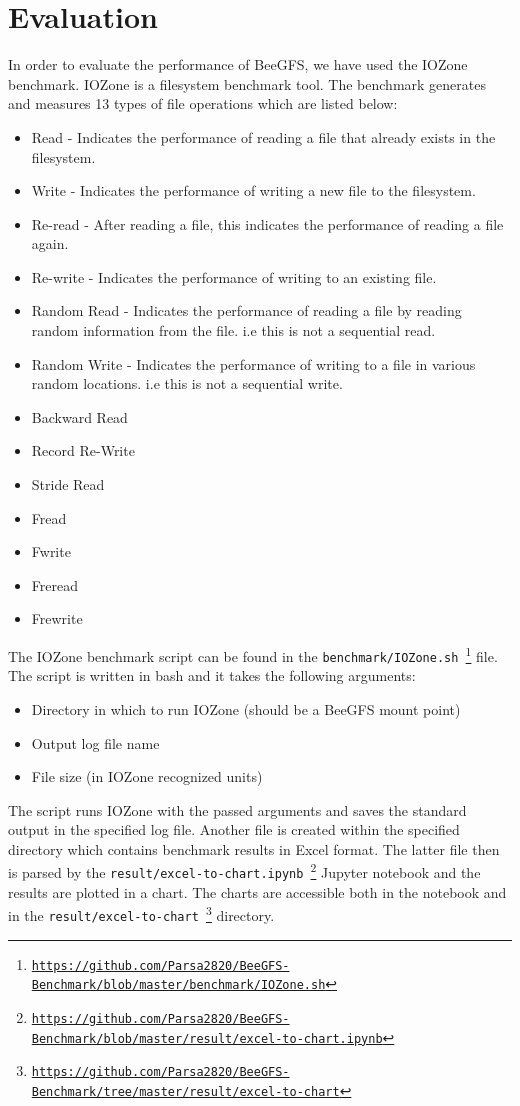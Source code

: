 \documentclass{article}
\begin{document}
\section{Evaluation}
In order to evaluate the performance of BeeGFS, we have used the IOZone benchmark.
IOZone is a filesystem benchmark tool. The benchmark generates and measures 13 types of file operations which are listed below: \cite{iozoneexample}
\begin{itemize}
    \item Read - Indicates the performance of reading a file that already exists in the filesystem.
    \item Write - Indicates the performance of writing a new file to the filesystem.
    \item Re-read - After reading a file, this indicates the performance of reading a file again.
    \item Re-write - Indicates the performance of writing to an existing file.
    \item Random Read - Indicates the performance of reading a file by reading random information from the file. i.e this is not a sequential read.
    \item Random Write - Indicates the performance of writing to a file in various random locations. i.e this is not a sequential write.
    \item Backward Read
    \item Record Re-Write
    \item Stride Read
    \item Fread
    \item Fwrite
    \item Freread
    \item Frewrite
\end{itemize}
The IOZone benchmark script can be found in the \texttt{benchmark/IOZone.sh \footnote{\url{https://github.com/Parsa2820/BeeGFS-Benchmark/blob/master/benchmark/IOZone.sh}}} file. The script is written in bash and it takes the following arguments:
\begin{itemize}
    \item Directory in which to run IOZone (should be a BeeGFS mount point)
    \item Output log file name
    \item File size (in IOZone recognized units)
\end{itemize}
The script runs IOZone with the passed arguments and saves the standard output in the specified log file. Another file is created within the specified directory which contains benchmark results in Excel format. The latter file then is parsed by the \texttt{result/excel-to-chart.ipynb \footnote{\url{https://github.com/Parsa2820/BeeGFS-Benchmark/blob/master/result/excel-to-chart.ipynb}}} Jupyter notebook and the results are plotted in a chart. The charts are accessible both in the notebook and in the \texttt{result/excel-to-chart \footnote{\url{https://github.com/Parsa2820/BeeGFS-Benchmark/tree/master/result/excel-to-chart}}} directory.
\end{document}
